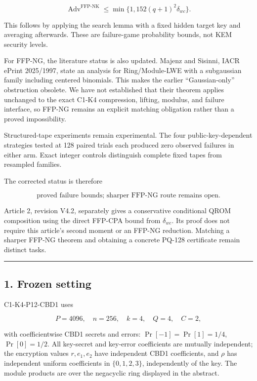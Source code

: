 \documentclass[11pt,a4paper]{article}
\begin{document}
\[
\operatorname{Adv}^{\mathrm{FFP\text{-}NK}}
\le\min\{1,152(q+1)^2\delta_{wc}\}.
\]

This follows by applying the search lemma with a fixed hidden target key and averaging afterwards. These are failure-game probability bounds, not KEM security levels.

For FFP-NG, the literature status is also updated. Majenz and Sisinni, IACR ePrint 2025/1997, state an analysis for Ring/Module-LWE with a subgaussian family including centered binomials. This makes the earlier ``Gaussian-only'' obstruction obsolete. We have not established that their theorem applies unchanged to the exact C1-K4 compression, lifting, modulus, and failure interface, so FFP-NG remains an explicit matching obligation rather than a proved impossibility.

Structured-tape experiments remain experimental. The four public-key-dependent strategies tested at 128 paired trials each produced zero observed failures in either arm. Exact integer controls distinguish complete fixed tapes from resampled families.

The corrected status is therefore

\[
\boxed{
\text{proved failure bounds; sharper FFP-NG route remains open}.
}
\]

Article 2, revision V4.2, separately gives a conservative conditional QROM composition using the direct FFP-CPA bound from \(\delta_{wc}\). Its proof does not require this article's second moment or an FFP-NG reduction. Matching a sharper FFP-NG theorem and obtaining a concrete PQ-128 certificate remain distinct tasks.

\begin{center}\rule{0.5\linewidth}{0.5pt}\end{center}

\subsection{1. Frozen setting}\label{frozen-setting}

C1-K4-P12-CBD1 uses

\[
P=4096,\quad n=256,\quad k=4,\quad Q=4,\quad C=2,
\]

with coefficientwise CBD1 secrets and errors: \(\Pr[-1]=\Pr[1]=1/4\), \(\Pr[0]=1/2\). All key-secret and key-error coefficients are mutually independent; the encryption values \(r,e_1,e_2\) have independent CBD1 coefficients, and \(\rho\) has independent uniform coefficients in \(\{0,1,2,3\}\), independently of the key. The module products are over the negacyclic ring displayed in the abstract.
\end{document}
